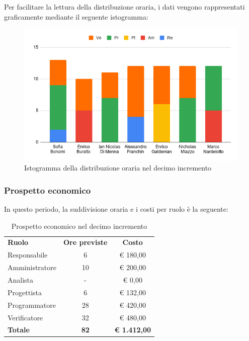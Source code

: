 \documentclass[../piano-di-progetto.tex]{subfiles}
\begin{document}
  Per facilitare la lettura della distribuzione oraria, i dati vengono rappresentati graficamente mediante il seguente istogramma:
  \begin{figure}[H]
    \centering
    \includegraphics[width=12cm]{img/ore-10-incr.png}
    \caption{Istogramma della distribuzione oraria nel decimo incremento}
    \label{fig:ore-componente-progettazione}
  \end{figure}

  \subsubsection{Prospetto economico}
  In questo periodo, la suddivisione oraria e i costi per ruolo è la seguente:

  \begin{table}[H]
    \centering
    \begin{tabular}{lcc}
      \rowcolor{lightgray}
      \textbf{Ruolo}  & \textbf{Ore previste} & \textbf{Costo}      \\


Responsabile    & 6           & € 180,00            \\
Amministratore  & 10          & € 200,00            \\
Analista        & -           & € 0,00              \\
Progettista     & 6           & € 132,00            \\
Programmatore   & 28          & € 420,00            \\
Verificatore    & 32          & € 480,00            \\
\textbf{Totale} & \textbf{82} & \textbf{€ 1.412,00}

    \end{tabular}
    \caption{Prospetto economico nel decimo incremento}
  \end{table}
\end{document}
